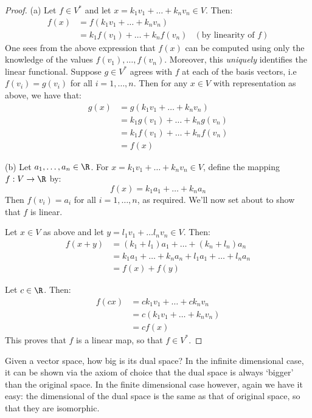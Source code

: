 \begin{proof}
  (a) Let \( f\in V^* \) and let \( x=k_1v_1+\dots+k_nv_n\in V \). Then:
  \begin{align*}
    f(x)&= f(k_1v_1+\dots+k_nv_n)\\
    &= k_1f(v_1)+\dots+k_nf(v_n) &(\text{by linearity of }f)
  \end{align*}
  One sees from the above expression that \( f(x) \) can be computed using only the knowledge of the values \( f(v_1),\dots,f(v_n) \). Moreover, this \emph{uniquely} identifies the linear functional. Suppose \( g\in V^* \) agrees with \( f \) at each of the basis vectors, i.e \( f(v_i)=g(v_i) \) for all \( i=1,\dots,n \). Then for any \( x\in V \) with representation as above, we have that:
  \begin{align*}
    g(x)&= g(k_1v_1+\dots+k_nv_n)\\
    &= k_1g(v_1)+\dots+k_ng(v_n)\\
    &= k_1f(v_1)+\dots+k_nf(v_n)\\
    &= f(x)
  \end{align*}

  \vspace{3mm}

  (b) Let \( a_1,\dots, a_n\in\R \). For \( x=k_1v_1+\dots+k_nv_n\in V \), define the mapping \( f:V\to\R \) by:
  \[ f(x)=k_1a_1+\dots+k_na_n \]
  Then \( f(v_i)=a_i \) for all \( i=1,\dots,n \), as required. We'll now set about to show that \( f \) is linear.

  \vspace{3mm}

  Let \( x\in V \) as above and let \( y=l_1v_1+\dots l_nv_n\in V \). Then:
  \begin{align*}
    f(x+y)&= (k_1+l_1)a_1+\dots+(k_n+l_n)a_n\\
    &= k_1a_1+\dots+k_na_n+l_1a_1+\dots+l_na_n\\
    &= f(x)+f(y)
  \end{align*}

  Let \( c\in\R \). Then:
  \begin{align*}
    f(cx)&= ck_1v_1+\dots+ck_nv_n\\
    &= c(k_1v_1+\dots+k_nv_n)\\
    &= cf(x)
  \end{align*}
  This proves that \( f \) is a linear map, so that \( f\in V^* \).
\end{proof}

Given a vector space, how big is its dual space? In the infinite dimensional case, it can be shown via the axiom of choice that the dual space is always `bigger' than the original space. In the finite dimensional case however, again we have it easy: the dimensional of the dual space is the same as that of original space, so that they are isomorphic.

